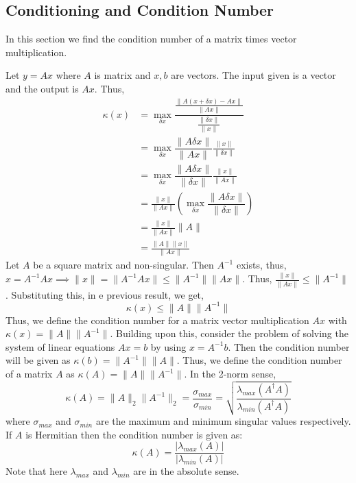 \subsection{Conditioning and Condition Number}In this section we find the condition number of a matrix times vector multiplication.

Let $y=Ax$ where $A$ is matrix and $x,b$ are vectors. The input given is a vector and the output is $Ax$. Thus,
\begin{align*}
\kappa(x) &= \max_{\delta x}\dfrac{\frac{\|A(x+\delta x) - Ax\|}{\|Ax\|}}{\frac{\|\delta x\|}{\|x\|}}\\
&=\max_{\delta x} \dfrac{\|A\delta x\|}{\|Ax\|}\frac{\|x\|}{\|\delta x\|}\\
&=\max_{\delta x} \dfrac{\|A\delta x\|}{\|\delta x\|}\frac{\|x\|}{\|Ax\|}\\
&=\frac{\|x\|}{\|Ax\|}\left(\max_{\delta x} \dfrac{\|A\delta x\|}{\|\delta x\|}\right)\\
&=\frac{\|x\|}{\|Ax\|}\|A\|\\
&=\frac{\|A\|\|x\|}{\|Ax\|}
\end{align*}
Let $A$ be a square matrix and non-singular. Then $A^{-1}$ exists, thus, $x=A^{-1}Ax \implies \|x\|=\|A^{-1}Ax\|\leq \|A^{-1}\|\|Ax\|$.
Thus, $\frac{\|x\|}{\|Ax\|}\leq \|A^{-1}\|$. Substituting this, in e previous result, we get,
\[
\kappa(x)\leq \|A\|\|A^{-1}\|
\]
Thus, we define the condition number for a matrix vector multiplication $Ax$ with $\kappa(x)=\|A\|\|A^{-1}\|$.
Building upon this, consider the problem of solving the system of linear equations $Ax=b$ by using $x=A^{-1}b$. Then the condition number will be given as $\kappa(b)=\|A^{-1}\|\|A\|$. Thus, we define the condition number of a matrix $A$ as $\kappa(A)=\|A\|\|A^{-1}\|$. In the 2-norm sense, 
\[
\kappa(A)=\|A\|_2\|A^{-1}\|_2=\dfrac{\sigma_{max}}{\sigma_{min}}=\sqrt{\dfrac{\lambda_{max}(A^{\dagger} A)}{\lambda_{min}(A^{\dagger}A)}}
\]
where $\sigma_{max}$ and $\sigma_{min}$ are the maximum and minimum singular values respectively. If $A$ is Hermitian then the condition number is given as:
\[
\kappa(A)=\dfrac{|\lambda_{max}(A)|}{|\lambda_{min}(A)|}
\]
Note that here $\lambda_{max}$ and $\lambda_{min}$ are in the absolute sense.

